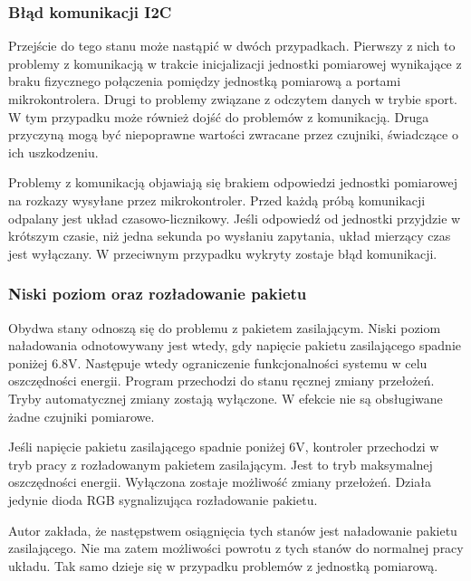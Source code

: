 \subsubsection{Błąd komunikacji I2C}
Przejście do tego stanu może nastąpić w dwóch przypadkach. Pierwszy z nich to problemy z komunikacją w trakcie inicjalizacji jednostki pomiarowej wynikające z braku fizycznego połączenia pomiędzy jednostką pomiarową a portami mikrokontrolera. Drugi to problemy związane z odczytem danych w trybie sport. W tym przypadku może również dojść do problemów z komunikacją. Druga przyczyną mogą być niepoprawne wartości zwracane przez czujniki, świadczące o ich uszkodzeniu.

Problemy z komunikacją objawiają się brakiem odpowiedzi jednostki pomiarowej na rozkazy wysyłane przez mikrokontroler. Przed każdą próbą komunikacji odpalany jest układ czasowo-licznikowy. Jeśli odpowiedź od jednostki przyjdzie w krótszym czasie, niż jedna sekunda po wysłaniu zapytania, układ mierzący czas jest wyłączany. W przeciwnym przypadku wykryty zostaje błąd komunikacji.  
\subsubsection{Niski poziom oraz rozładowanie pakietu}

Obydwa stany odnoszą się do problemu z pakietem zasilającym. Niski poziom naładowania odnotowywany jest wtedy, gdy napięcie pakietu zasilającego spadnie poniżej 6.8V. Następuje wtedy ograniczenie funkcjonalności systemu w celu oszczędności energii. Program przechodzi do stanu ręcznej zmiany przełożeń. Tryby automatycznej zmiany zostają wyłączone. W efekcie nie są obsługiwane żadne czujniki pomiarowe.

Jeśli napięcie pakietu zasilającego spadnie poniżej 6V, kontroler przechodzi w tryb pracy z rozładowanym pakietem zasilającym. Jest to tryb maksymalnej oszczędności energii. Wyłączona zostaje możliwość zmiany przełożeń. Działa jedynie dioda RGB sygnalizująca rozładowanie pakietu.

Autor zakłada, że następstwem osiągnięcia tych stanów jest naładowanie pakietu zasilającego. Nie ma zatem możliwości powrotu z tych stanów do normalnej pracy układu. Tak samo dzieje się w przypadku problemów z jednostką pomiarową.
\label{niskiPoziom}
